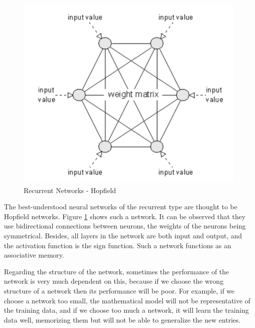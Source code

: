 \begin{figure}[htbp]
	\centerline{\includegraphics[scale=0.75]{fig/reatea-recurenta.png}}  
  \caption{Recurrent Networks - Hopfield  \cite{book.neuronal.network.1995}}
  \label{fig:hopfield}
  
\end{figure}

\par The best-understood neural networks of the recurrent type are thought to be Hopfield networks.
 Figure \ref{fig:hopfield} shows such a network. It can be observed that they use bidirectional connections between neurons, 
 the weights of the neurons being symmetrical. Besides, all layers in the network are both input and output, and the activation function is the sign function. 
Such a network functions as an associative memory.

Regarding the structure of the network, sometimes the performance of the network is very much dependent on this, 
because if we choose the wrong structure of a network then its performance will be poor. For example, if we choose a network too small, 
the mathematical model will not be representative of the training data,
 and if we choose too much a network, it will learn the training data well, memorizing them but will not be able to generalize the new entries. \cite{book.neuronal.network.1995}


